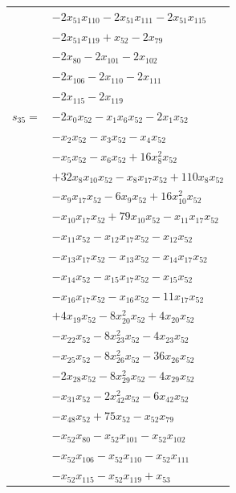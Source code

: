 \begin{longtable}{@{}r@{\;}l@{}}
 & \(\displaystyle -2x_{51}x_{110} -2x_{51}x_{111} -2x_{51}x_{115}\) \\
 & \(\displaystyle -2x_{51}x_{119} +x_{52} -2x_{79}\) \\
 & \(\displaystyle -2x_{80} -2x_{101} -2x_{102}\) \\
 & \(\displaystyle -2x_{106} -2x_{110} -2x_{111}\) \\
 & \(\displaystyle -2x_{115} -2x_{119}\) \\[3pt]
\(s_{35}=\) & \(\displaystyle -2x_{0}x_{52} -x_{1}x_{6}x_{52} -2x_{1}x_{52}\) \\
 & \(\displaystyle -x_{2}x_{52} -x_{3}x_{52} -x_{4}x_{52}\) \\
 & \(\displaystyle -x_{5}x_{52} -x_{6}x_{52} +16x_{8}^{2}x_{52}\) \\
 & \(\displaystyle +32x_{8}x_{10}x_{52} -x_{8}x_{17}x_{52} +110x_{8}x_{52}\) \\
 & \(\displaystyle -x_{9}x_{17}x_{52} -6x_{9}x_{52} +16x_{10}^{2}x_{52}\) \\
 & \(\displaystyle -x_{10}x_{17}x_{52} +79x_{10}x_{52} -x_{11}x_{17}x_{52}\) \\
 & \(\displaystyle -x_{11}x_{52} -x_{12}x_{17}x_{52} -x_{12}x_{52}\) \\
 & \(\displaystyle -x_{13}x_{17}x_{52} -x_{13}x_{52} -x_{14}x_{17}x_{52}\) \\
 & \(\displaystyle -x_{14}x_{52} -x_{15}x_{17}x_{52} -x_{15}x_{52}\) \\
 & \(\displaystyle -x_{16}x_{17}x_{52} -x_{16}x_{52} -11x_{17}x_{52}\) \\
 & \(\displaystyle +4x_{19}x_{52} -8x_{20}^{2}x_{52} +4x_{20}x_{52}\) \\
 & \(\displaystyle -x_{22}x_{52} -8x_{23}^{2}x_{52} -4x_{23}x_{52}\) \\
 & \(\displaystyle -x_{25}x_{52} -8x_{26}^{2}x_{52} -36x_{26}x_{52}\) \\
 & \(\displaystyle -2x_{28}x_{52} -8x_{29}^{2}x_{52} -4x_{29}x_{52}\) \\
 & \(\displaystyle -x_{31}x_{52} -2x_{42}^{2}x_{52} -6x_{42}x_{52}\) \\
 & \(\displaystyle -x_{48}x_{52} +75x_{52} -x_{52}x_{79}\) \\
 & \(\displaystyle -x_{52}x_{80} -x_{52}x_{101} -x_{52}x_{102}\) \\
 & \(\displaystyle -x_{52}x_{106} -x_{52}x_{110} -x_{52}x_{111}\) \\
 & \(\displaystyle -x_{52}x_{115} -x_{52}x_{119} +x_{53}\) \\[3pt]

\end{longtable}
